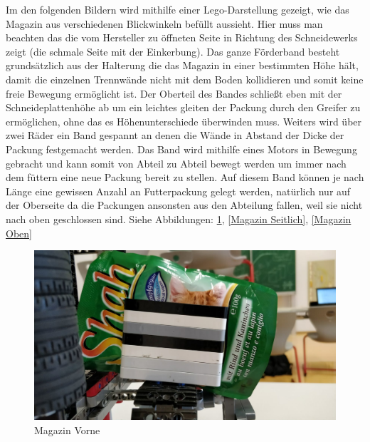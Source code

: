 Im den folgenden Bildern wird mithilfe einer Lego-Darstellung gezeigt, wie das Magazin aus verschiedenen Blickwinkeln befüllt aussieht. Hier muss man beachten das die vom Hersteller zu öffneten Seite in Richtung des Schneidewerks zeigt (die schmale Seite mit der Einkerbung). Das ganze Förderband besteht grundsätzlich aus der Halterung die das Magazin in einer bestimmten Höhe hält, damit die einzelnen Trennwände nicht mit dem Boden kollidieren und somit keine freie Bewegung ermöglicht ist. Der Oberteil des Bandes schließt eben mit der Schneideplattenhöhe ab um ein leichtes gleiten der Packung durch den Greifer zu ermöglichen, ohne das es Höhenunterschiede überwinden muss. Weiters wird über zwei Räder ein Band gespannt an denen die Wände in Abstand der Dicke der Packung festgemacht werden. Das Band wird mithilfe eines Motors in Bewegung gebracht und kann somit von Abteil zu Abteil bewegt werden um immer nach dem füttern eine neue Packung bereit zu stellen. Auf diesem Band können je nach Länge eine gewissen Anzahl an Futterpackung gelegt werden, natürlich nur auf der Oberseite da die Packungen ansonsten aus den Abteilung fallen, weil sie nicht nach oben geschlossen sind.  Siehe Abbildungen: \ref{Magazin Vorne}, \ref{Magazin Seitlich}, \ref{Magazin Oben}

\begin{figure}[H]
\begin{center}
\includegraphics[width=13cm]{Bilder/Ablauf_1_png/Magazin_Vorne.png}
\caption{Magazin Vorne}
\label{Magazin Vorne}
\end{center}
\end{figure}

